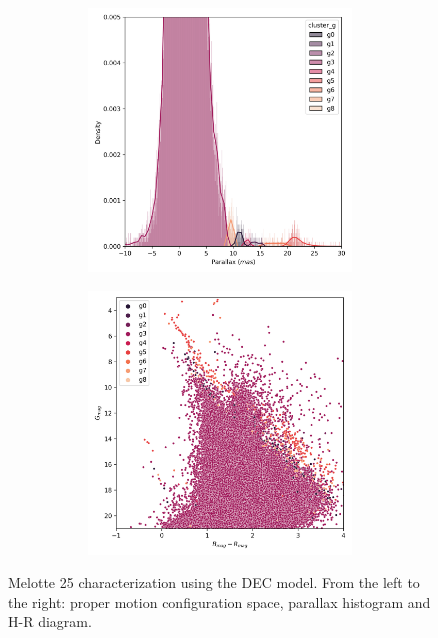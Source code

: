 \documentclass[11pt,a4paper,english,twocolumn]{article}
\begin{document}
\begin{figure}[htbp]
\begin{subfigure}{\columnwidth}
\begin{subfigure}[t]{0.30\textwidth}
      \includegraphics[width=\textwidth]{../figures/melotte_25/dec_parallax_melotte_25.png}
    \end{subfigure}
    \hfill
    \begin{subfigure}[t]{0.30\textwidth}
      \centering
      \includegraphics[width=\textwidth]{../figures/melotte_25/dec_hr_diagram_melotte_25.png}
    \end{subfigure}
  \end{subfigure}
  \caption{Melotte 25 characterization using the DEC model.
           From the left to the right: proper motion configuration
           space, parallax histogram and H-R diagram.}
  \label{fig:result_melotte_25_dec}
\end{figure}
\end{document}
